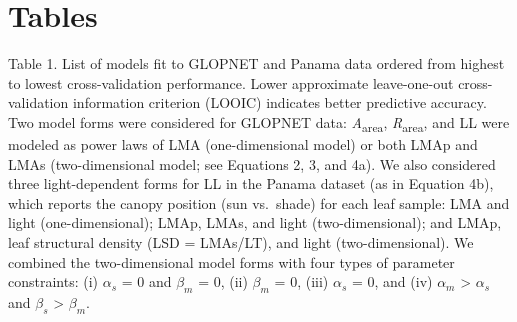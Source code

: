 \documentclass[
  12pt,
  a4paper,
,tablecaptionabove
]{scrartcl}
\begin{document}
\newpage

\hypertarget{tables}{%
\section{Tables}\label{tables}}

Table 1. List of models fit to GLOPNET and Panama data ordered from
highest to lowest cross-validation performance. Lower approximate
leave-one-out cross-validation information criterion (LOOIC) indicates
better predictive accuracy. Two model forms were considered for GLOPNET
data: \emph{A}\textsubscript{area}, \emph{R}\textsubscript{area}, and LL
were modeled as power laws of LMA (one-dimensional model) or both LMAp
and LMAs (two-dimensional model; see Equations 2, 3, and 4a). We also
considered three light-dependent forms for LL in the Panama dataset (as
in Equation 4b), which reports the canopy position (sun vs.~shade) for
each leaf sample: LMA and light (one-dimensional); LMAp, LMAs, and light
(two-dimensional); and LMAp, leaf structural density (LSD = LMAs/LT),
and light (two-dimensional). We combined the two-dimensional model forms
with four types of parameter constraints: (i) \(\alpha_s\) = 0 and
\(\beta_m\) = 0, (ii) \(\beta_m\) = 0, (iii) \(\alpha_s\) = 0, and (iv)
\(\alpha_m\) \textgreater{} \(\alpha_s\) and \(\beta_s\) \textgreater{}
\(\beta_m\).
\end{document}

